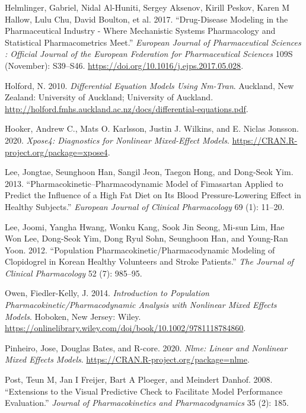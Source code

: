 \documentclass[
  11pt,
  krantz2, a4paper, twoside]{krantz}
\newlength{\cslhangindent}
\newenvironment{cslreferences}%
  {\setlength{\parindent}{0pt}%
  \everypar{\setlength{\hangindent}{\cslhangindent}}\ignorespaces}%
  {\par}
\theoremstyle{definition}
\theoremstyle{definition}
\theoremstyle{definition}
\theoremstyle{remark}
\begin{document}
\begin{cslreferences}
\leavevmode\hypertarget{ref-helmlinger2017drug}{}%
Helmlinger, Gabriel, Nidal Al-Huniti, Sergey Aksenov, Kirill Peskov, Karen M Hallow, Lulu Chu, David Boulton, et al. 2017. ``Drug-Disease Modeling in the Pharmaceutical Industry - Where Mechanistic Systems Pharmacology and Statistical Pharmacometrics Meet.'' \emph{European Journal of Pharmaceutical Sciences : Official Journal of the European Federation for Pharmaceutical Sciences} 109S (November): S39--S46. \url{https://doi.org/10.1016/j.ejps.2017.05.028}.

\leavevmode\hypertarget{ref-nickholford}{}%
Holford, N. 2010. \emph{Differential Equation Models Using Nm-Tran}. Auckland, New Zealand: University of Auckland; University of Auckland. \url{http://holford.fmhs.auckland.ac.nz/docs/differential-equations.pdf}.

\leavevmode\hypertarget{ref-R-xpose4}{}%
Hooker, Andrew C., Mats O. Karlsson, Justin J. Wilkins, and E. Niclas Jonsson. 2020. \emph{Xpose4: Diagnostics for Nonlinear Mixed-Effect Models}. \url{https://CRAN.R-project.org/package=xpose4}.

\leavevmode\hypertarget{ref-lee2013pharmacokinetic}{}%
Lee, Jongtae, Seunghoon Han, Sangil Jeon, Taegon Hong, and Dong-Seok Yim. 2013. ``Pharmacokinetic--Pharmacodynamic Model of Fimasartan Applied to Predict the Influence of a High Fat Diet on Its Blood Pressure-Lowering Effect in Healthy Subjects.'' \emph{European Journal of Clinical Pharmacology} 69 (1): 11--20.

\leavevmode\hypertarget{ref-lee2012population}{}%
Lee, Joomi, Yangha Hwang, Wonku Kang, Sook Jin Seong, Mi-sun Lim, Hae Won Lee, Dong-Seok Yim, Dong Ryul Sohn, Seunghoon Han, and Young-Ran Yoon. 2012. ``Population Pharmacokinetic/Pharmacodynamic Modeling of Clopidogrel in Korean Healthy Volunteers and Stroke Patients.'' \emph{The Journal of Clinical Pharmacology} 52 (7): 985--95.

\leavevmode\hypertarget{ref-kelly}{}%
Owen, Fiedler-Kelly, J. 2014. \emph{Introduction to Population Pharmacokinetic/Pharmacodynamic Analysis with Nonlinear Mixed Effects Models}. Hoboken, New Jersey: Wiley. \url{https://onlinelibrary.wiley.com/doi/book/10.1002/9781118784860}.

\leavevmode\hypertarget{ref-R-nlme}{}%
Pinheiro, Jose, Douglas Bates, and R-core. 2020. \emph{Nlme: Linear and Nonlinear Mixed Effects Models}. \url{https://CRAN.R-project.org/package=nlme}.

\leavevmode\hypertarget{ref-post2008extensions}{}%
Post, Teun M, Jan I Freijer, Bart A Ploeger, and Meindert Danhof. 2008. ``Extensions to the Visual Predictive Check to Facilitate Model Performance Evaluation.'' \emph{Journal of Pharmacokinetics and Pharmacodynamics} 35 (2): 185.


\end{cslreferences}
\end{document}
